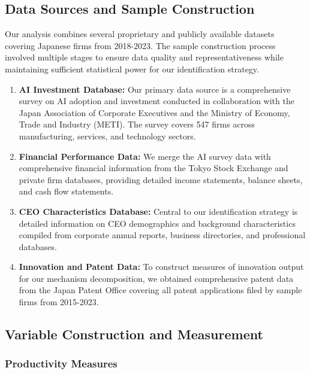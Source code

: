 \documentclass[12pt, a4paper]{article}
\begin{document}
\subsection{Data Sources and Sample Construction}

Our analysis combines several proprietary and publicly available datasets covering Japanese firms from 2018-2023. The sample construction process involved multiple stages to ensure data quality and representativeness while maintaining sufficient statistical power for our identification strategy.

\begin{enumerate}
\item \textbf{AI Investment Database:} Our primary data source is a comprehensive survey on AI adoption and investment conducted in collaboration with the Japan Association of Corporate Executives and the Ministry of Economy, Trade and Industry (METI). The survey covers 547 firms across manufacturing, services, and technology sectors.

\item \textbf{Financial Performance Data:} We merge the AI survey data with comprehensive financial information from the Tokyo Stock Exchange and private firm databases, providing detailed income statements, balance sheets, and cash flow statements.

\item \textbf{CEO Characteristics Database:} Central to our identification strategy is detailed information on CEO demographics and background characteristics compiled from corporate annual reports, business directories, and professional databases.

\item \textbf{Innovation and Patent Data:} To construct measures of innovation output for our mechanism decomposition, we obtained comprehensive patent data from the Japan Patent Office covering all patent applications filed by sample firms from 2015-2023.
\end{enumerate}

\subsection{Variable Construction and Measurement}

\subsubsection{Productivity Measures}
\end{document}
